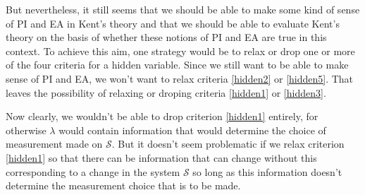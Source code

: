 But nevertheless, it still seems that we should be able to make some kind of sense of PI and EA in Kent's theory and that we should be able to evaluate Kent's theory on the basis of whether these notions of PI and EA are true in this context. To achieve this aim, one strategy would be to relax or drop one or more of the 
four criteria for a hidden variable. Since we still want to be able to make sense of PI and EA, we won't want to relax criteria \ref{hidden2} or \ref{hidden5}. That leaves the possibility of relaxing or droping criteria \ref{hidden1} or \ref{hidden3}. 

Now clearly, we wouldn't be able to drop criterion \ref{hidden1} entirely, for otherwise $\lambda$ would contain information that would determine the choice of measurement made on $\mathcal{S}$. But it doesn't seem problematic if we relax criterion \ref{hidden1} so that there can be information that can change without this corresponding to a change in the system $\mathcal{S}$ so long as this information doesn't determine the measurement choice that is to be made. 

